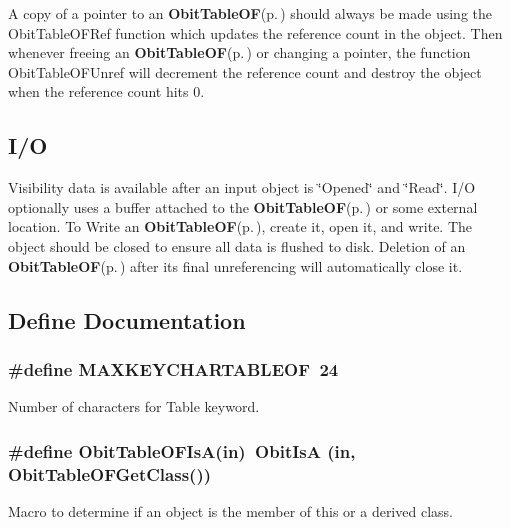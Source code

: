 A copy of a pointer to an {\bf Obit\-Table\-OF}{\rm (p.\,\pageref{structObitTableOF})} should always be made using the Obit\-Table\-OFRef function which updates the reference count in the object. Then whenever freeing an {\bf Obit\-Table\-OF}{\rm (p.\,\pageref{structObitTableOF})} or changing a pointer, the function Obit\-Table\-OFUnref will decrement the reference count and destroy the object when the reference count hits 0.\subsection{I/O}\label{ObitTableOF_8h_ObitTableOFUsage}
Visibility data is available after an input object is \char`\"{}Opened\char`\"{} and \char`\"{}Read\char`\"{}. I/O optionally uses a buffer attached to the {\bf Obit\-Table\-OF}{\rm (p.\,\pageref{structObitTableOF})} or some external location. To Write an {\bf Obit\-Table\-OF}{\rm (p.\,\pageref{structObitTableOF})}, create it, open it, and write. The object should be closed to ensure all data is flushed to disk. Deletion of an {\bf Obit\-Table\-OF}{\rm (p.\,\pageref{structObitTableOF})} after its final unreferencing will automatically close it.

\subsection{Define Documentation}
\subsubsection{\setlength{\rightskip}{0pt plus 5cm}\#define MAXKEYCHARTABLEOF\ 24}\label{ObitTableOF_8h_a0}


Number of characters for Table keyword. 

\subsubsection{\setlength{\rightskip}{0pt plus 5cm}\#define Obit\-Table\-OFIs\-A(in)\ Obit\-Is\-A (in, Obit\-Table\-OFGet\-Class())}\label{ObitTableOF_8h_a3}


Macro to determine if an object is the member of this or a derived class. 

